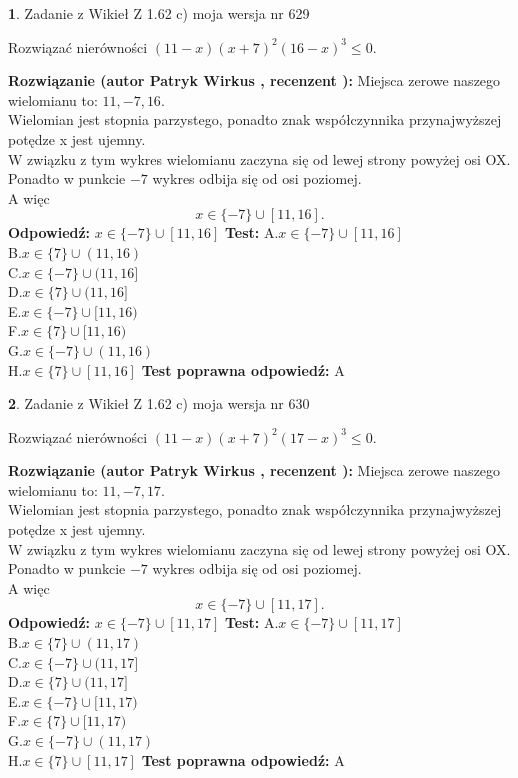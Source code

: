 \documentclass[12pt, a4paper]{article}
\theoremstyle{definition} %
\newtheorem{zad}{}
\newcommand{\zadStart}[1]{\begin{zad}#1\newline}
\newcommand{\zadStop}{\end{zad}}
\newcommand{\rozwStart}[2]{\noindent \textbf{Rozwiązanie (autor #1 , recenzent #2): }\newline}
\newcommand{\rozwStop}{\newline}
\newcommand{\odpStart}{\noindent \textbf{Odpowiedź:}\newline}
\newcommand{\odpStop}{\newline}
\newcommand{\testStart}{\noindent \textbf{Test:}\newline}
\newcommand{\testStop}{\newline}
\newcommand{\kluczStart}{\noindent \textbf{Test poprawna odpowiedź:}\newline}
\newcommand{\kluczStop}{\newline}
\begin{document}
\zadStart{Zadanie z Wikieł Z 1.62 c) moja wersja nr 629}

Rozwiązać nierówności $(11-x)(x+7)^{2}(16-x)^{3}\le0$.
\zadStop
\rozwStart{Patryk Wirkus}{}
Miejsca zerowe naszego wielomianu to: $11, -7, 16$.\\
Wielomian jest stopnia parzystego, ponadto znak współczynnika przy\linebreak najwyższej potędze x jest ujemny.\\ W związku z tym wykres wielomianu zaczyna się od lewej strony powyżej osi OX.\\
Ponadto w punkcie $-7$ wykres odbija się od osi poziomej.\\
A więc $$x \in \{-7\} \cup [11,16].$$
\rozwStop
\odpStart
$x \in \{-7\} \cup [11,16]$
\odpStop
\testStart
A.$x \in \{-7\} \cup [11,16]$\\
B.$x \in \{7\} \cup (11,16)$\\
C.$x \in \{-7\} \cup (11,16]$\\
D.$x \in \{7\} \cup (11,16]$\\
E.$x \in \{-7\} \cup [11,16)$\\
F.$x \in \{7\} \cup [11,16)$\\
G.$x \in \{-7\} \cup (11,16)$\\
H.$x \in \{7\} \cup [11,16]$
\testStop
\kluczStart
A
\kluczStop



\zadStart{Zadanie z Wikieł Z 1.62 c) moja wersja nr 630}

Rozwiązać nierówności $(11-x)(x+7)^{2}(17-x)^{3}\le0$.
\zadStop
\rozwStart{Patryk Wirkus}{}
Miejsca zerowe naszego wielomianu to: $11, -7, 17$.\\
Wielomian jest stopnia parzystego, ponadto znak współczynnika przy\linebreak najwyższej potędze x jest ujemny.\\ W związku z tym wykres wielomianu zaczyna się od lewej strony powyżej osi OX.\\
Ponadto w punkcie $-7$ wykres odbija się od osi poziomej.\\
A więc $$x \in \{-7\} \cup [11,17].$$
\rozwStop
\odpStart
$x \in \{-7\} \cup [11,17]$
\odpStop
\testStart
A.$x \in \{-7\} \cup [11,17]$\\
B.$x \in \{7\} \cup (11,17)$\\
C.$x \in \{-7\} \cup (11,17]$\\
D.$x \in \{7\} \cup (11,17]$\\
E.$x \in \{-7\} \cup [11,17)$\\
F.$x \in \{7\} \cup [11,17)$\\
G.$x \in \{-7\} \cup (11,17)$\\
H.$x \in \{7\} \cup [11,17]$
\testStop
\kluczStart
A
\kluczStop
\end{document}
